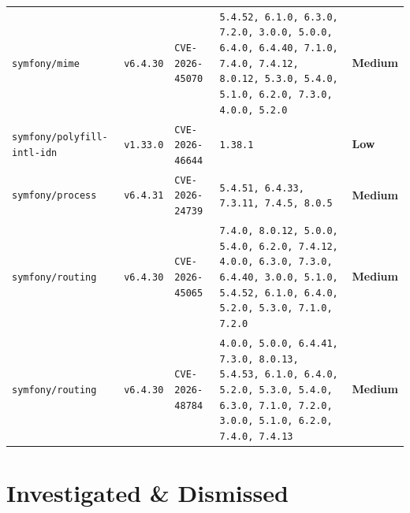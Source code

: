 \documentclass[11pt,a4paper]{article}
\newcommand{\sevbadge}[1]{\textbf{\textcolor{sev#1}{#1}}}
\begin{document}
{\begin{longtable}{@{}>{\raggedright\arraybackslash}p{} l >{\raggedright\arraybackslash}p{} l l@{}}
\texttt{\small symfony/\allowbreak{}mime} & \texttt{\small v6.4.30} & \texttt{\small CVE-2026-45070} & \texttt{\small 5.4.52, 6.1.0, 6.3.0, 7.2.0, 3.0.0, 5.0.0, 6.4.0, 6.4.40, 7.1.0, 7.4.0, 7.4.12, 8.0.12, 5.3.0, 5.4.0, 5.1.0, 6.2.0, 7.3.0, 4.0.0, 5.2.0} & \sevbadge{Medium}\\
\texttt{\small symfony/\allowbreak{}polyfill-intl-idn} & \texttt{\small v1.33.0} & \texttt{\small CVE-2026-46644} & \texttt{\small 1.38.1} & \sevbadge{Low}\\
\texttt{\small symfony/\allowbreak{}process} & \texttt{\small v6.4.31} & \texttt{\small CVE-2026-24739} & \texttt{\small 5.4.51, 6.4.33, 7.3.11, 7.4.5, 8.0.5} & \sevbadge{Medium}\\
\texttt{\small symfony/\allowbreak{}routing} & \texttt{\small v6.4.30} & \texttt{\small CVE-2026-45065} & \texttt{\small 7.4.0, 8.0.12, 5.0.0, 5.4.0, 6.2.0, 7.4.12, 4.0.0, 6.3.0, 7.3.0, 6.4.40, 3.0.0, 5.1.0, 5.4.52, 6.1.0, 6.4.0, 5.2.0, 5.3.0, 7.1.0, 7.2.0} & \sevbadge{Medium}\\
\texttt{\small symfony/\allowbreak{}routing} & \texttt{\small v6.4.30} & \texttt{\small CVE-2026-48784} & \texttt{\small 4.0.0, 5.0.0, 6.4.41, 7.3.0, 8.0.13, 5.4.53, 6.1.0, 6.4.0, 5.2.0, 5.3.0, 5.4.0, 6.3.0, 7.1.0, 7.2.0, 3.0.0, 5.1.0, 6.2.0, 7.4.0, 7.4.13} & \sevbadge{Medium}\\
\bottomrule\end{longtable}}
\clearpage\section*{Investigated \& Dismissed}
\end{document}
